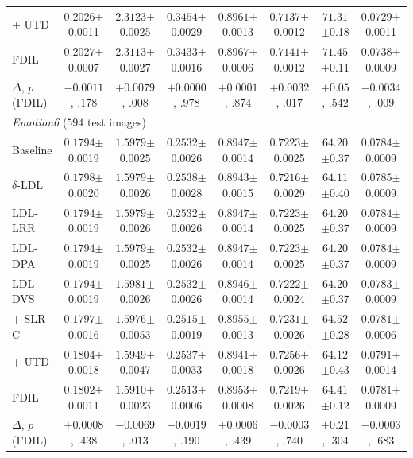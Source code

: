 {\begin{table}[!h]
{\begin{tabular}{lccccccc}
\quad + UTD & $\mathbf{0.2026}${\tiny$\pm$0.0011} & $2.3123${\tiny$\pm$0.0025} & $0.3454${\tiny$\pm$0.0029} & $0.8961${\tiny$\pm$0.0013} & $0.7137${\tiny$\pm$0.0012} & $71.31${\tiny$\pm$0.18} & $\mathbf{0.0729}${\tiny$\pm$0.0011} \\
FDIL & $0.2027${\tiny$\pm$0.0007} & $2.3113${\tiny$\pm$0.0027} & $0.3433${\tiny$\pm$0.0016} & $0.8967${\tiny$\pm$0.0006} & $\mathbf{0.7141}${\tiny$\pm$0.0012} & $71.45${\tiny$\pm$0.11} & $0.0738${\tiny$\pm$0.0009} \\
$\Delta$, $p$ (FDIL) & $-0.0011$, $.178$ & $+0.0079$, $\mathit{.008}$ & $+0.0000$, $.978$ & $+0.0001$, $.874$ & $+0.0032$, $\mathit{.017}$ & $+0.05$, $.542$ & $-0.0034$, $\mathit{.009}$ \\
\hline
\multicolumn{8}{l}{\textit{Emotion6} ($594$ test images)} \\
Baseline & $\mathbf{0.1794}${\tiny$\pm$0.0019} & $1.5979${\tiny$\pm$0.0025} & $0.2532${\tiny$\pm$0.0026} & $0.8947${\tiny$\pm$0.0014} & $0.7223${\tiny$\pm$0.0025} & $64.20${\tiny$\pm$0.37} & $0.0784${\tiny$\pm$0.0009} \\
$\delta$-LDL & $0.1798${\tiny$\pm$0.0020} & $1.5979${\tiny$\pm$0.0026} & $0.2538${\tiny$\pm$0.0028} & $0.8943${\tiny$\pm$0.0015} & $0.7216${\tiny$\pm$0.0029} & $64.11${\tiny$\pm$0.40} & $0.0785${\tiny$\pm$0.0009} \\
LDL-LRR & $\mathbf{0.1794}${\tiny$\pm$0.0019} & $1.5979${\tiny$\pm$0.0026} & $0.2532${\tiny$\pm$0.0026} & $0.8947${\tiny$\pm$0.0014} & $0.7223${\tiny$\pm$0.0025} & $64.20${\tiny$\pm$0.37} & $0.0784${\tiny$\pm$0.0009} \\
LDL-DPA & $\mathbf{0.1794}${\tiny$\pm$0.0019} & $1.5979${\tiny$\pm$0.0025} & $0.2532${\tiny$\pm$0.0026} & $0.8947${\tiny$\pm$0.0014} & $0.7223${\tiny$\pm$0.0025} & $64.20${\tiny$\pm$0.37} & $0.0784${\tiny$\pm$0.0009} \\
LDL-DVS & $\mathbf{0.1794}${\tiny$\pm$0.0019} & $1.5981${\tiny$\pm$0.0026} & $0.2532${\tiny$\pm$0.0026} & $0.8946${\tiny$\pm$0.0014} & $0.7222${\tiny$\pm$0.0024} & $64.20${\tiny$\pm$0.37} & $0.0783${\tiny$\pm$0.0009} \\
\quad + SLR-C & $0.1797${\tiny$\pm$0.0016} & $1.5976${\tiny$\pm$0.0053} & $0.2515${\tiny$\pm$0.0019} & $\mathbf{0.8955}${\tiny$\pm$0.0013} & $0.7231${\tiny$\pm$0.0026} & $\mathbf{64.52}${\tiny$\pm$0.28} & $\mathbf{0.0781}${\tiny$\pm$0.0006} \\
\quad + UTD & $0.1804${\tiny$\pm$0.0018} & $1.5949${\tiny$\pm$0.0047} & $0.2537${\tiny$\pm$0.0033} & $0.8941${\tiny$\pm$0.0018} & $\mathbf{0.7256}${\tiny$\pm$0.0026} & $64.12${\tiny$\pm$0.43} & $0.0791${\tiny$\pm$0.0014} \\
FDIL & $0.1802${\tiny$\pm$0.0011} & $\mathbf{1.5910}${\tiny$\pm$0.0023} & $\mathbf{0.2513}${\tiny$\pm$0.0006} & $0.8953${\tiny$\pm$0.0008} & $0.7219${\tiny$\pm$0.0026} & $64.41${\tiny$\pm$0.12} & $\mathbf{0.0781}${\tiny$\pm$0.0009} \\
$\Delta$, $p$ (FDIL) & $+0.0008$, $.438$ & $-0.0069$, $\mathit{.013}$ & $-0.0019$, $.190$ & $+0.0006$, $.439$ & $-0.0003$, $.740$ & $+0.21$, $.304$ & $-0.0003$, $.683$ \\
\hline
\end{tabular}}
\end{table}}

